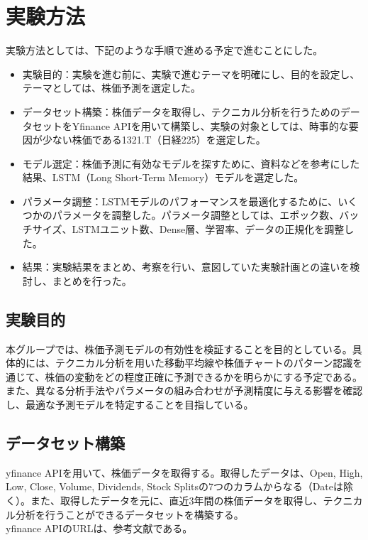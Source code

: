 \documentclass[a4paper, 11pt, titlepage]{jsarticle}
\begin{document}
\section{実験方法}
実験方法としては、下記のような手順で進める予定で進むことにした。
\begin{itemize}
  \item 実験目的：実験を進む前に、実験で進むテーマを明確にし、目的を設定し、テーマとしては、株価予測を選定した。
  \item データセット構築：株価データを取得し、テクニカル分析を行うためのデータセットをYfinance APIを用いて構築し、実験の対象としては、時事的な要因が少ない株価である1321.T（日経225）を選定した。
  \item モデル選定：株価予測に有効なモデルを探すために、資料などを参考にした結果、LSTM（Long Short-Term Memory）モデルを選定した。
  \item パラメータ調整：LSTMモデルのパフォーマンスを最適化するために、いくつかのパラメータを調整した。パラメータ調整としては、エポック数、バッチサイズ、LSTMユニット数、Dense層、学習率、データの正規化を調整した。
  \item 結果：実験結果をまとめ、考察を行い、意図していた実験計画との違いを検討し、まとめを行った。
\end{itemize}
\subsection{実験目的}
\indent 本グループでは、株価予測モデルの有効性を検証することを目的としている。具体的には、テクニカル分析を用いた移動平均線や株価チャートのパターン認識を通じて、株価の変動をどの程度正確に予測できるかを明らかにする予定である。また、異なる分析手法やパラメータの組み合わせが予測精度に与える影響を確認し、最適な予測モデルを特定することを目指している。

\subsection{データセット構築}
\indent yfinance APIを用いて、株価データを取得する。取得したデータは、Open, High, Low, Close, Volume, Dividends, Stock Splitsの7つのカラムからなる（Dateは除く）。また、取得したデータを元に、直近3年間の株価データを取得し、テクニカル分析を行うことができるデータセットを構築する。\\
\indent yfinance APIのURLは、参考文献\cite{yfin}である。
\end{document}
